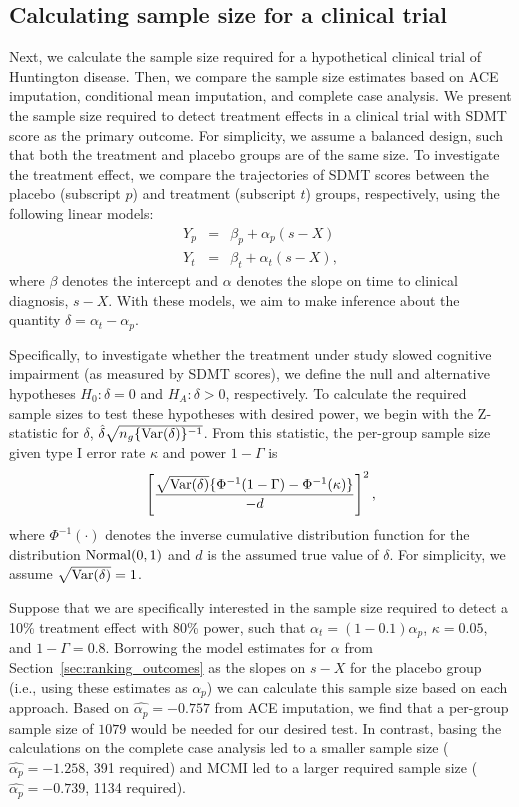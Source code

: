 \documentclass[12pt]{article}
\def\Normal{\hbox{Normal}}
\def\bse{\begin{eqnarray*}}
\def\ese{\end{eqnarray*}}
\def\bse{\begin{eqnarray*}}
\def\ese{\end{eqnarray*}}
\begin{document}
\subsection{Calculating sample size for a clinical trial}
Next, we calculate the sample size required for a hypothetical clinical trial of Huntington disease. Then, we compare the sample size estimates based on ACE imputation, conditional mean imputation, and complete case analysis. We present the sample size required to detect treatment effects in a clinical trial with SDMT score as the primary outcome. For simplicity, we assume a balanced design, such that both the treatment and placebo groups are of the same size. To investigate the treatment effect, we compare the trajectories of SDMT scores between the placebo (subscript $p$) and treatment (subscript $t$) groups, respectively, using the following linear models:
\bse
Y_p&=&\beta_p + \alpha_p (s - X) \\
Y_t&=&\beta_t + \alpha_t (s - X),
\ese
where $\beta$ denotes the intercept and $\alpha$ denotes the slope on time to clinical diagnosis, $s - X$. With these models, we aim to make inference about the quantity $\delta = \alpha_t - \alpha_p$. 

Specifically, to investigate whether the treatment under study slowed cognitive impairment (as measured by SDMT scores), we define the null and alternative hypotheses $H_0: \delta=0$ and $H_A:\delta > 0$, respectively. To calculate the required sample sizes to test these hypotheses with desired power, we begin with the Z-statistic for $\delta$, $\hat{\delta} \sqrt{ n_g \{ {\rm Var} (\delta) \}^{-1}}$. %
From this statistic, the per-group sample size given type I error rate $\kappa$ and power $1 - \Gamma$ is
\bse
\left[ \frac{\sqrt{{\rm Var}(\delta)}\{\Phi^{-1}(1 - \Gamma)-\Phi^{-1}(\kappa)\}}{-d} \right]^2,
\ese
where $\Phi^{-1}(\cdot)$ denotes the inverse cumulative distribution function for the distribution $\Normal(0,1)$ and $d$ is the assumed true value of $\delta$. %
For simplicity, we assume $\sqrt{{\rm Var}(\delta)}=1$.

Suppose that we are specifically interested in the sample size required to detect %
a 10\% treatment effect with 80\% power, such that $\alpha_t = (1 - 0.1)\alpha_p$, $\kappa=0.05$, and $1 - \Gamma=0.8$. Borrowing the model estimates for $\alpha$ from Section~\ref{sec:ranking_outcomes} as the slopes on $s - X$ for the placebo group (i.e., using these estimates as $\alpha_p$) we can calculate this sample size based on each approach. Based on $\hat{\alpha_p}=-0.757$ from ACE imputation, we find that a per-group sample size of $1079$ would be needed for our desired test. In contrast, basing the calculations on the complete case analysis led to a smaller sample size ($\hat{\alpha_p}= -1.258$, 391 required) and MCMI led to a larger required sample size ($\hat{\alpha_p}= -0.739$, 1134 required). 
\end{document}
